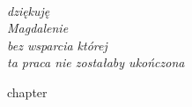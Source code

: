 \documentclass[
  a4paper,
  twoside,
  justified,
  nobib,
  marginals=raggedright,
]{tufte-book}
\begin{document}
\frontmatter
\maketitle

\cleardoublepage
\thispagestyle{empty}
~\vfill
\vfill
\begin{fullwidth}
\raggedleft\noindent\fontsize{16}{26}\selectfont\itshape
\nohyphenation
dziękuję \\
Magdalenie \\
bez wsparcia której \\
ta praca nie zostałaby ukończona
\end{fullwidth}
\vfill

\tableofcontents



\mainmatter

{chapter}

\end{document}
